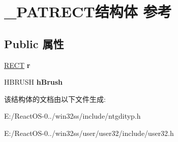 \hypertarget{struct___p_a_t_r_e_c_t}{}\section{\+\_\+\+P\+A\+T\+R\+E\+C\+T结构体 参考}
\label{struct___p_a_t_r_e_c_t}
\subsection*{Public 属性}
\begin{DoxyCompactItemize}
\item 
\mbox{\label{struct___p_a_t_r_e_c_t_a9b41a51db89415079f870901ff8fc301}} 
\hyperlink{structtag_r_e_c_t}{R\+E\+CT} {\bfseries r}
\item 
\mbox{\label{struct___p_a_t_r_e_c_t_ae7d62ae141e66c7ab97af74ae6c482df}} 
H\+B\+R\+U\+SH {\bfseries h\+Brush}
\end{DoxyCompactItemize}


该结构体的文档由以下文件生成\+:\begin{DoxyCompactItemize}
\item 
E\+:/\+React\+O\+S-\/0../win32ss/include/ntgdityp.\+h\item 
E\+:/\+React\+O\+S-\/0../win32ss/user/user32/include/user32.\+h\end{DoxyCompactItemize}
